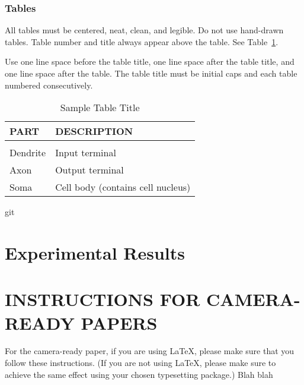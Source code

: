 \documentclass[twoside]{article}
\begin{document}
\subsubsection{Tables}

All tables must be centered, neat, clean, and legible. Do not use hand-drawn tables. Table number and title always appear above the table.
See Table~\ref{sample-table}.

Use one line space before the table title, one line space after the table title, and one line space after the table. The table title must be
initial caps and each table numbered consecutively.

\begin{table}[h]
\caption{Sample Table Title} \label{sample-table}
\begin{center}
\begin{tabular}{ll}
{\bf PART}  &{\bf DESCRIPTION} \\
\hline \\
Dendrite         &Input terminal \\
Axon             &Output terminal \\
Soma             &Cell body (contains cell nucleus) \\
\end{tabular}
\end{center}git 
\end{table}

\section{Experimental Results}
\label{sec:supmat}


\section{INSTRUCTIONS FOR CAMERA-READY PAPERS}

For the camera-ready paper, if you are using \LaTeX, please make sure
that you follow these instructions.  (If you are not using \LaTeX,
please make sure to achieve the same effect using your chosen
typesetting package.) Blah blah
\end{document}
